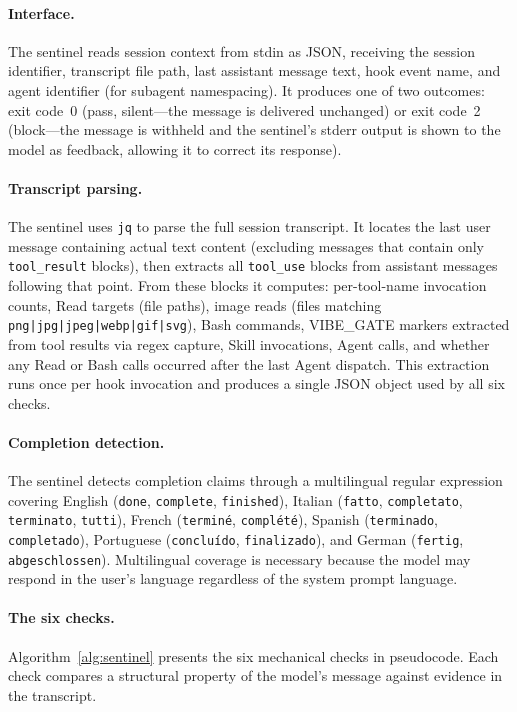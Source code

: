 \paragraph{Interface.}
The sentinel reads session context from stdin as JSON, receiving the session identifier, transcript file path, last assistant message text, hook event name, and agent identifier (for subagent namespacing).
It produces one of two outcomes: exit code~0 (pass, silent---the message is delivered unchanged) or exit code~2 (block---the message is withheld and the sentinel's stderr output is shown to the model as feedback, allowing it to correct its response).

\paragraph{Transcript parsing.}
The sentinel uses \texttt{jq} to parse the full session transcript.
It locates the last user message containing actual text content (excluding messages that contain only \texttt{tool\_result} blocks), then extracts all \texttt{tool\_use} blocks from assistant messages following that point.
From these blocks it computes: per-tool-name invocation counts, Read targets (file paths), image reads (files matching \texttt{png|jpg|jpeg|webp|gif|svg}), Bash commands, VIBE\_GATE markers extracted from tool results via regex capture, Skill invocations, Agent calls, and whether any Read or Bash calls occurred after the last Agent dispatch.
This extraction runs once per hook invocation and produces a single JSON object used by all six checks.

\paragraph{Completion detection.}
The sentinel detects completion claims through a multilingual regular expression covering English (\texttt{done}, \texttt{complete}, \texttt{finished}), Italian (\texttt{fatto}, \texttt{completato}, \texttt{terminato}, \texttt{tutti}), French (\texttt{termin\'{e}}, \texttt{compl\'{e}t\'{e}}), Spanish (\texttt{terminado}, \texttt{completado}), Portuguese (\texttt{conclu\'{i}do}, \texttt{finalizado}), and German (\texttt{fertig}, \texttt{abgeschlossen}).
Multilingual coverage is necessary because the model may respond in the user's language regardless of the system prompt language.

\paragraph{The six checks.}
Algorithm~\ref{alg:sentinel} presents the six mechanical checks in pseudocode.
Each check compares a structural property of the model's message against evidence in the transcript.

